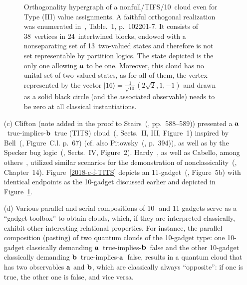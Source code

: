 \begin{enumerate}[leftmargin=2.3em,labelsep=4mm]
\begin{figure}[H]
\begin{center}
\begin{tikzpicture} [scale=0.25, rotate=117]
\end{tikzpicture}
\end{center}
\caption{\label{2018-c-f-TIFS}
Orthogonality hypergraph of a nonfull/TIFS/10~cloud even for Type (III) value assignments.
A faithful orthogonal realization was enumerated in~\cite{2015-AnalyticKS}, Table.~1, p.~102201-7.
It consists of 38~vertices in 24~intertwined blocks,
endowed with a nonseparating set of 13~two-valued states and therefore is not set representable by partition logics.
The state depicted is the only one allowing ${\bf a}$ to be one.
Moreover, this cloud has no unital set of two-valued states, as for all of them, the vertex
represented by the vector
$
\vert {16} \rangle
=
\frac{1}{\sqrt{10}}
\left(
2\sqrt{2},1,-1
\right)
$ and
drawn as a solid black circle (and the associated
observable) needs to be zero at all classical instantiations.
}
\end{figure}


\item[(c)]
Clifton (note added in the proof to Stairs~(\cite{stairs83}, pp.~588--589))
presented a ${\bf a}$~true-implies-${\bf b}$~true (TITS) cloud~(\cite{clifton-93,Johansen-1994,Vermaas-1994}, Sects.~II, III, Figure~1)
inspired by Bell~(\cite{Belinfante-73}, Figure~C.l. p.~67) (cf. also Pitowsky~(\cite{Pitowsky-1982-subs}, p.~394)),
as well as by the Specker bug logic~(\cite{clifton-93}, Sects.~IV, Figure~2).
Hardy~\cite{Hardy-92,Hardy-93,hardy-97},
as well as Cabello, among others~\cite{cabello-1994,Cabello-1996-diss,cabello-96,cabello-97-nhvp,Badziag-2011,Cabello-2013-HP,Cabello-2013-Hardylike,Ramanathan-18},
utilized similar scenarios for the demonstration of nonclassicality~(\cite{svozil-pac}, Chapter~14).
Figure~\ref{2018-c-f-TITS} depicts an 11-gadget~(\cite{svozil-2018-whycontexts}, Figure~5b) with identical endpoints as the 10-gadget
discussed earlier and depicted in Figure~\ref{2018-c-f-TIFS}.

\item[(d)]
Various parallel and serial compositions of 10- and 11-gadgets serve as a ``gadget toolbox'' to obtain clouds, which, if they are interpreted classically,
exhibit other interesting relational properties.
For instance, the parallel composition (pasting) of two quantum clouds of the 10-gadget type:
one 10-gadget classically demanding ${\bf a}$~true-implies-${\bf b}$~false
and the other 10-gadget classically demanding ${\bf b}$~true-implies-${\bf a}$~false, results in a quantum cloud that has two observables ${\bf a}$ and ${\bf b}$,
which are classically always ``opposite'': if one is true, the other one is false, and {vice versa}.


\end{enumerate}
